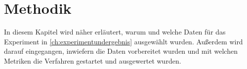 \chapter{Methodik}
In diesem Kapitel wird näher erläutert, warum und welche Daten für das Experiment in \autoref{ch:experimentundergebnis} ausgewählt wurden. Außerdem wird darauf eingegangen, inwiefern die Daten vorbereitet wurden und mit welchen Metriken die Verfahren gestartet und ausgewertet wurden.



